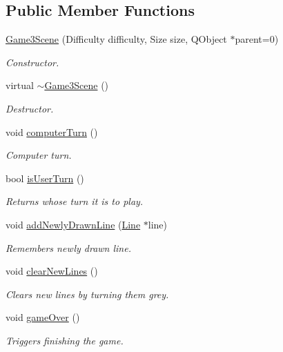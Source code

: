 \subsection*{\-Public \-Member \-Functions}
\begin{DoxyCompactItemize}
\item 
\hyperlink{classGame3Scene_a807bd1fd85f313df2a265d0ccbcd2a78}{\-Game3\-Scene} (\-Difficulty difficulty, \-Size size, \-Q\-Object $\ast$parent=0)
\begin{DoxyCompactList}\small\item\em \-Constructor. \end{DoxyCompactList}\item 
virtual \hyperlink{classGame3Scene_a6a41bfc50cb0f2304ecb7a82c39f615a}{$\sim$\-Game3\-Scene} ()
\begin{DoxyCompactList}\small\item\em \-Destructor. \end{DoxyCompactList}\item 
void \hyperlink{classGame3Scene_a42001b176b1bf8adaac5dbbdf78c944c}{computer\-Turn} ()
\begin{DoxyCompactList}\small\item\em \-Computer turn. \end{DoxyCompactList}\item 
bool \hyperlink{classGame3Scene_a15e0a02a54f5db10129d40bb9d5cd6ed}{is\-User\-Turn} ()
\begin{DoxyCompactList}\small\item\em \-Returns whose turn it is to play. \end{DoxyCompactList}\item 
void \hyperlink{classGame3Scene_a13d2095b46ba4f23f5b747bbbc556890}{add\-Newly\-Drawn\-Line} (\hyperlink{classLine}{\-Line} $\ast$line)
\begin{DoxyCompactList}\small\item\em \-Remembers newly drawn line. \end{DoxyCompactList}\item 
void \hyperlink{classGame3Scene_a8af77b8adc69ae0d2e6dc336674dd2e1}{clear\-New\-Lines} ()
\begin{DoxyCompactList}\small\item\em \-Clears new lines by turning them grey. \end{DoxyCompactList}\item 
void \hyperlink{classGame3Scene_a634df6ad5ac3776bc3d18519214e2eec}{game\-Over} ()
\begin{DoxyCompactList}\small\item\em \-Triggers finishing the game. \end{DoxyCompactList}\item 

\end{DoxyCompactItemize}
